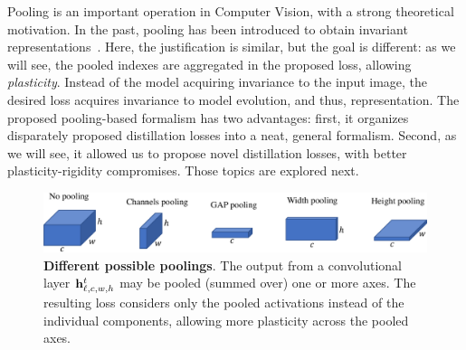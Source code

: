 Pooling is an important operation in Computer Vision, with a strong theoretical motivation. In the
past, pooling has been introduced to obtain invariant
representations~\citep{lowe1999sift,lazbnik2006spatial_pyramid_matching}. Here, the justification is
similar, but the goal is different: as we will see, the pooled indexes are aggregated in the
proposed loss, allowing \textit{plasticity}. Instead of the model acquiring invariance to the input
image, the desired loss acquires invariance to model evolution, and thus, representation.
%
The proposed pooling-based formalism has two advantages: first, it organizes disparately proposed
distillation losses into a neat, general formalism. Second, as we will see, it allowed us to propose
novel distillation losses, with better plasticity-rigidity compromises. Those topics are explored
next.

\begin{figure}[tb]
    \begin{center}
        \includegraphics[width=0.90\linewidth]{images/podnet/pooling}
    \end{center}
    \caption{\textbf{Different possible poolings}. The output from a convolutional layer
        $\mathbf{h}^{t}_{\ell,c,w,h}$ may be pooled (summed over) one or more axes. The resulting loss
        considers only the pooled activations instead of the individual components, allowing more
        plasticity across the pooled axes.}
    \label{fig:podnet_pooling}
\end{figure}


